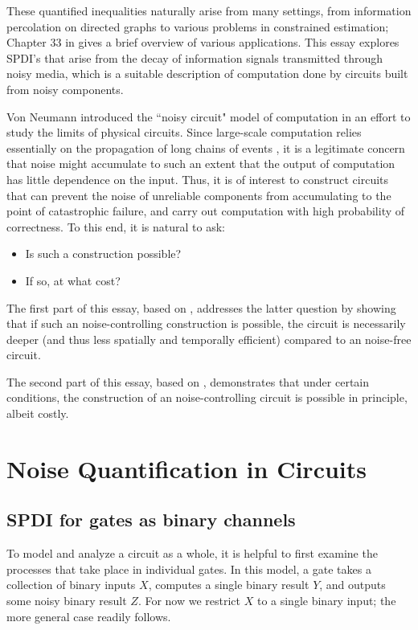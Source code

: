 \documentclass[12pt,reqno]{amsart}
\theoremstyle{plain} %
\theoremstyle{remark}
\theoremstyle{definition}
\begin{document}
These quantified inequalities naturally arise from many settings, from information percolation on directed graphs to various problems in constrained estimation; Chapter 33 in \cite{PW} gives a brief overview of various applications. This essay explores SPDI's that arise from the decay of information signals transmitted through noisy media, which is a suitable description of computation done by circuits built from noisy components.

Von Neumann introduced the ``noisy circuit" model of computation in an effort to study the limits of physical circuits. Since large-scale computation relies essentially on the propagation of long chains of events \cite{vN}, it is a legitimate concern that noise might accumulate to such an extent that the output of computation has little dependence on the input. Thus, it is of interest to construct circuits that can prevent the noise of unreliable components from accumulating to the point of catastrophic failure, and carry out computation with high probability of correctness. To this end, it is natural to ask:
\begin{itemize}
    \item Is such a construction possible?
    \item If so, at what cost?
\end{itemize}
The first part of this essay, based on \cite{ES}, addresses the latter question by showing that if such an noise-controlling construction is possible, the circuit is necessarily deeper (and thus less spatially and temporally efficient) compared to an noise-free circuit. 

The second part of this essay, based on \cite{vN}, demonstrates that under certain conditions, the construction of an noise-controlling circuit is possible in principle, albeit costly.

\section{Noise Quantification in Circuits}

\subsection{SPDI for gates as binary channels}

To model and analyze a circuit as a whole, it is helpful to first examine the processes that take place in individual gates. In this model, a gate takes a collection of binary inputs $X$, computes a single binary result $Y$, and outputs some noisy binary result $Z$. For now we restrict $X$ to a single binary input; the more general case readily follows.
\end{document}

